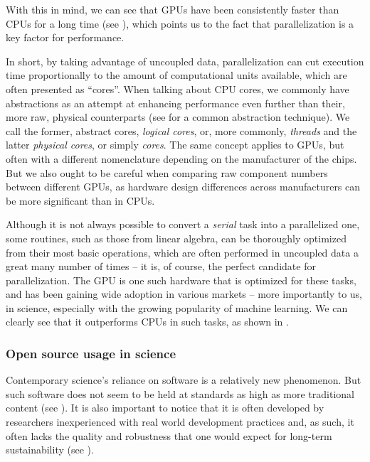 \documentclass[conference, onecolumn]{IEEEtran}
\begin{document}
With this in mind, we can see that GPUs have been consistently faster than CPUs
for a long time (see \cite{sun2019summarizing}), which points us to the fact
that parallelization is a key factor for performance.

In short, by taking advantage of uncoupled data, parallelization can cut
execution time proportionally to the amount of computational units available,
which are often presented as ``cores''.
When talking about CPU cores, we commonly have abstractions as an attempt at
enhancing performance even further than their, more raw, physical counterparts
(see \cite{magro2002hyper} for a common abstraction technique).
We call the former, abstract cores, \textit{logical cores}, or, more commonly,
\textit{threads} and the latter \textit{physical cores}, or simply
\textit{cores}.
The same concept applies to GPUs, but often with a different nomenclature
depending on the manufacturer of the chips.
But we also ought to be careful when comparing raw component numbers between
different GPUs, as hardware design differences across manufacturers can be
more significant than in CPUs.

Although it is not always possible to convert a \textit{serial} task into a
parallelized one, some routines, such as those from linear algebra, can be
thoroughly optimized from their most basic operations, which are often
performed in uncoupled data a great many number of times -- it is, of course,
the perfect candidate for parallelization.
The GPU is one such hardware that is optimized for these tasks, and has been
gaining wide adoption in various markets -- more importantly to us, in science,
especially with the growing popularity of machine learning.
We can clearly see that it outperforms CPUs in such tasks, as shown in
\cite{buber2018performance}.

\subsubsection{Open source usage in science} \label{sec:motivation:floss-in-science}

Contemporary science's reliance on software is a relatively new phenomenon.
But such software does not seem to be held at standards as high as more
traditional content (see \cite{sufi2014software}).
It is also important to notice that it is often developed by researchers
inexperienced with real world development practices and, as such, it often
lacks the quality and robustness that one would expect for long-term
sustainability (see \cite{carver2022survey}).
\end{document}
